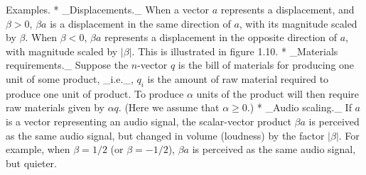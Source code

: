 Examples.
* _Displacements._ When a vector \(a\) represents a displacement, and \(\beta>0\), \(\beta a\) is a displacement in the same direction of \(a\), with its magnitude scaled by \(\beta\). When \(\beta<0\), \(\beta a\) represents a displacement in the opposite direction of \(a\), with magnitude scaled by \(|\beta|\). This is illustrated in figure 1.10.
* _Materials requirements._ Suppose the \(n\)-vector \(q\) is the bill of materials for producing one unit of some product, _i.e._, \(q_{i}\) is the amount of raw material required to produce one unit of product. To produce \(\alpha\) units of the product will then require raw materials given by \(\alpha q\). (Here we assume that \(\alpha\geq 0\).)
* _Audio scaling._ If \(a\) is a vector representing an audio signal, the scalar-vector product \(\beta a\) is perceived as the same audio signal, but changed in volume (loudness) by the factor \(|\beta|\). For example, when \(\beta=1/2\) (or \(\beta=-1/2\)), \(\beta a\) is perceived as the same audio signal, but quieter.

 